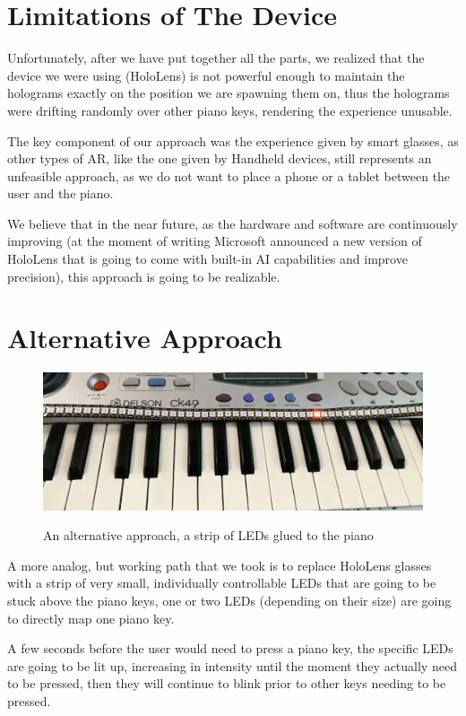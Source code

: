 \documentclass[12 pct]{report}
\begin{document}
\section{Limitations of The Device}

Unfortunately, after we have put together all the parts, we realized that the device we were using (HoloLens) is not powerful enough to maintain the holograms exactly on the position we are spawning them on, thus the holograms were drifting randomly over other piano keys, rendering the experience unusable.

The key component of our approach was the experience given by smart glasses, as other types of AR, like the one given by Handheld devices, still represents an unfeasible approach, as we do not want to place a phone or a tablet between the user and the piano.

We believe that in the near future, as the hardware and software are continuously improving (at the moment of writing Microsoft announced a new version of HoloLens that is going to come with built-in AI capabilities and improve precision), this approach is going to be realizable.

\section{Alternative Approach}

\begin{figure}[H]
\includegraphics[width=1.0\textwidth]{piano-leds}
\centering
\label{fig:feature-points}
\caption{An alternative approach, a strip of LEDs glued to the piano}
\end{figure}

A more analog, but working path that we took is to replace HoloLens glasses with a strip of very small, individually controllable LEDs that are going to be stuck above the piano keys, one or two LEDs (depending on their size) are going to directly map one piano key. 

A few seconds before the user would need to press a piano key, the specific LEDs are going to be lit up, increasing in intensity until the moment they actually need to be pressed, then they will continue to blink prior to other keys needing to be pressed.
\end{document}
